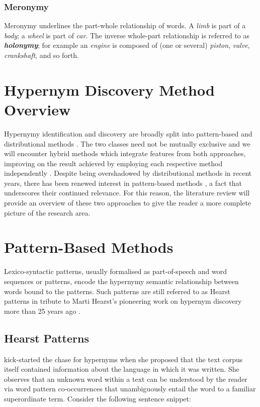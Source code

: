 \subsubsection{Meronymy}
Meronymy underlines the part-whole relationship of words.  A \textit{limb} is part of a \textit{body}; a \textit{wheel} is part of \textit{car}.  The inverse whole-part relationship is referred to as \textbf{\textit{holonymy}}; for example an \textit{engine} is composed of (one or several) \textit{piston}, \textit{valve}, \textit{crankshaft}, and so forth.

\section{Hypernym Discovery Method Overview}
Hypernymy identification and discovery are broadly split into pattern-based and distributional methods \citep{camacho2018semeval, Wang2017}.  The two classes need not be mutually exclusive and we will encounter hybrid methods which integrate features from both approaches, improving on the result achieved by employing each respective method independently  \citep{shwartz2016path, bernier2018crim}.  Despite being overshadowed by distributional methods in recent years, there has been renewed interest in pattern-based methods \citep{roller2018hearst}, a fact that underscores their continued relevance.
For this  reason, the literature review will provide an overview of these two approaches to give the reader a more complete picture of the research area.  

\section{Pattern-Based Methods} \label{Pattern-Based Methods}
Lexico-syntactic patterns, usually formalised as part-of-speech and word sequences or patterns, %
encode the hypernymy semantic relationship between words bound to the patterns.  Such patterns are still referred to as Hearst patterns in tribute to Marti Hearst's pioneering work on hypernym discovery more than 25 years ago \citep{hearst1992automatic}.

\subsection{Hearst Patterns} \label{Hearst Patterns}
\citet{hearst1992automatic} kick-started the chase for hypernyms when she proposed that the text corpus itself contained information about the language in which it was written.  She observes that an unknown word within a text can be understood by the reader via word pattern co-occurrences that unambiguously entail the word to a familiar superordinate term.  Consider the following sentence snippet:

